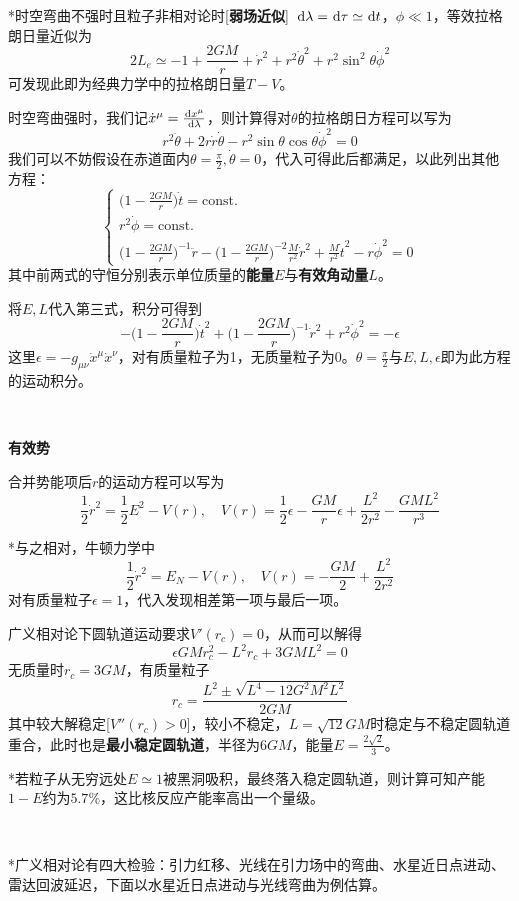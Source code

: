 \documentclass[a4paper,UTF8,fontset=windows]{ctexart}
\newcommand*{\dr}{\hspace{0.07em}\mathrm{d}}
\begin{document}
*时空弯曲不强时且粒子非相对论时[\textbf{弱场近似}]\ $\dr\lambda=\dr\tau\simeq\dr t$，$\phi\ll1$，等效拉格朗日量近似为
$$2L_e\simeq-1+\frac{2GM}{r}+\dot{r}^2+r^2\dot{\theta}^2+r^2\sin^2\theta\dot{\phi}^2$$
可发现此即为经典力学中的拉格朗日量$T-V$。

时空弯曲强时，我们记$\dot{x}^\mu=\frac{\dr x^\mu}{\dr\lambda}$，则计算得对$\theta$的拉格朗日方程可以写为
$$r^2\ddot{\theta}+2r\dot{r}\dot{\theta}-r^2\sin\theta\cos\theta\dot{\phi}^2=0$$
我们可以不妨假设在赤道面内$\theta=\frac{\pi}{2},\dot{\theta}=0$，代入可得此后都满足，以此列出其他方程：
$$\begin{cases}\big(1-\frac{2GM}{r}\big)\dot{t}=\text{const.}\\r^2\dot{\phi}=\text{const.}\\\big(1-\frac{2GM}{r}\big)^{-1}\ddot{r}-\big(1-\frac{2GM}{r}\big)^{-2}\frac{M}{r^2}\dot{r}^2+\frac{M}{r^2}\dot{t}^2-r\dot{\phi}^2=0\end{cases}$$
其中前两式的守恒分别表示单位质量的\textbf{能量}$E$与\textbf{有效角动量}$L$。

将$E,L$代入第三式，积分可得到
$$-\bigg(1-\frac{2GM}{r}\bigg)\dot{t}^2+\bigg(1-\frac{2GM}{r}\bigg)^{-1}\dot{r}^2+r^2\dot{\phi}^2=-\epsilon$$
这里$\epsilon=-g_{\mu\nu}\dot{x}^\mu\dot{x}^\nu$，对有质量粒子为1，无质量粒子为0。$\theta=\frac{\pi}{2}$与$E,L,\epsilon$即为此方程的运动积分。

\

\textbf{有效势}

合并势能项后$r$的运动方程可以写为
$$\frac{1}{2}\dot{r}^2=\frac{1}{2}E^2-V(r),\quad V(r)=\frac{1}{2}\epsilon-\frac{GM}{r}\epsilon+\frac{L^2}{2r^2}-\frac{GML^2}{r^3}$$

*与之相对，牛顿力学中
$$\frac{1}{2}\dot{r}^2=E_N-V(r),\quad V(r)=-\frac{GM}{2}+\frac{L^2}{2r^2}$$
对有质量粒子$\epsilon=1$，代入发现相差第一项与最后一项。

广义相对论下圆轨道运动要求$V'(r_c)=0$，从而可以解得
$$\epsilon GMr_c^2-L^2r_c+3GML^2=0$$
无质量时$r_c=3GM$，有质量粒子
$$r_c=\frac{L^2\pm\sqrt{L^4-12G^2M^2L^2}}{2GM}$$
其中较大解稳定[$V''(r_c)>0$]，较小不稳定，$L=\sqrt{12}GM$时稳定与不稳定圆轨道重合，此时也是\textbf{最小稳定圆轨道}，半径为$6GM$，能量$E=\frac{2\sqrt2}{3}$。

*若粒子从无穷远处$E\simeq1$被黑洞吸积，最终落入稳定圆轨道，则计算可知产能$1-E$约为$5.7\%$，这比核反应产能率高出一个量级。

\

*广义相对论有四大检验：引力红移、光线在引力场中的弯曲、水星近日点进动、雷达回波延迟，下面以水星近日点进动与光线弯曲为例估算。
\end{document}
